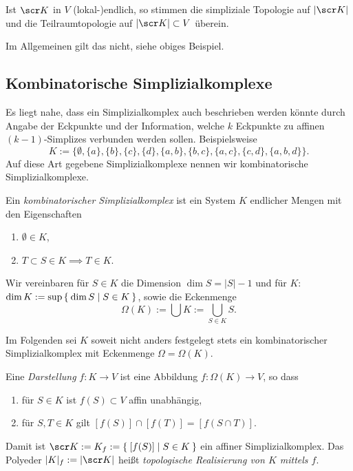 \begin{nt}
	Ist $\scr K$ in $V$ (lokal-)endlich, so stimmen die simpliziale Topologie auf $|\scr K|$ und die Teilraumtopologie auf $|\scr K| \subset V$ überein.

	Im Allgemeinen gilt das nicht, siehe obiges Beispiel.
\end{nt}


\subsection{Kombinatorische Simplizialkomplexe}

Es liegt nahe, dass ein Simplizialkomplex auch beschrieben werden könnte durch Angabe der Eckpunkte und der Information, welche $k$ Eckpunkte zu affinen $(k-1)$-Simplizes verbunden werden sollen.
Beispielsweise
\[
	K := \Big\{ \emptyset, \{a\}, \{b\}, \{c\}, \{d\}, \{a,b\}, \{b,c\}, \{a,c\}, \{c,d\}, \{a,b,d\} \Big\}.
\]
Auf diese Art gegebene Simplizialkomplexe nennen wir kombinatorische Simplizialkomplexe.

\begin{df}
	Ein \emph{kombinatorischer Simplizialkomplex} ist ein System $K$ endlicher Mengen mit den Eigenschaften
	\begin{enumerate}[1),start=0]
		\item
			$\emptyset \in K$,
		\item
			$T \subset S \in K \implies T \in K$.
	\end{enumerate}
	Wir vereinbaren für $S \in K$ die Dimension $\dim S = |S| - 1$ und für $K$: $\dim K := \sup \Set{ \dim S | S \in K }$, sowie die Eckenmenge
	\[
		\Omega(K) := \bigcup K := \bigcup_{S \in K} S.
	\]
\end{df}

\begin{conv}
	Im Folgenden sei $K$ soweit nicht anders festgelegt stets ein kombinatorischer Simplizialkomplex mit Eckenmenge $\Omega = \Omega(K)$.
\end{conv}

\begin{df}
	Eine \emph{Darstellung} $f: K \to V$ ist eine Abbildung $f: \Omega(K) \to V$, so dass
	\begin{enumerate}[1)]
		\item
			für $S \in K$ ist $f(S) \subset V$ affin unabhängig,
		\item
			für $S, T \in K$ gilt $[f(S)] \cap [f(T)] = [f(S \cap T)]$.
	\end{enumerate}
	Damit ist $\scr K := K_f := \Set{ [f(S)] | S \in K }$ ein affiner Simplizialkomplex.
	Das Polyeder $|K|_f := |\scr K|$ heißt \emph{topologische Realisierung von $K$ mittels $f$}.
\end{df}

